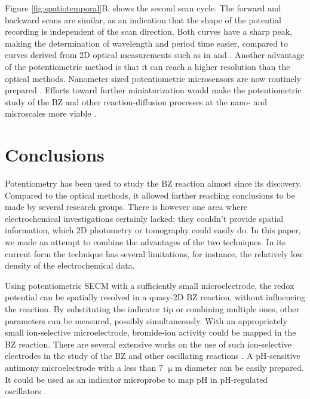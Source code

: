 \documentclass[3p, twocolumn]{elsarticle}
\begin{document}
Figure \ref{fig:spatiotemporal}B. shows the second scan cycle.
The forward and backward scans are similar, as an indication that the shape of the potential recording is independent of the scan direction.
Both curves have a sharp peak, making the determination of wavelength and period time easier, compared to curves derived from 2D optical measurements such as in \cite{hess1985} and \cite{hess1990}.
Another advantage of the potentiometric method is that it can reach a higher resolution than the optical methods.
Nanometer sized potentiometric microsensors are now routinely prepared \cite{mirkin2010}.
Efforts toward further miniaturization would make the potentiometric study of the BZ and other reaction-diffusion processes at the nano- and microscales more viable \cite{epstein2016}.

\section{Conclusions}
Potentiometry has been used to study the BZ reaction almost since its discovery.
Compared to the optical methods, it allowed farther reaching conclusions to be made by several research groups.
There is however one area where electrochemical investigations certainly lacked; they couldn't provide spatial information, which 2D photometry or tomography could easily do.
In this paper, we made an attempt to combine the advantages of the two techniques.
In its current form the technique has several limitations, for instance, the relatively low density of the electrochemical data.

Using potentiometric SECM with a sufficiently small microelectrode, the redox potential can be spatially resolved in a quasy-2D BZ reaction, without influencing the reaction.
By substituting the indicator tip or combining multiple ones, other parameters can be measured, possibly simultaneously.
With an appropriately small ion-selective microelectrode, bromide-ion activity could be mapped in the BZ reaction.
There are several extensive works on the use of such ion-selective electrodes in the study of the BZ and other oscillating reactions \cite{noszticzius1, noszticzius2}.
A pH-sensitive antimony microelectrode with a less than 7 $\upmu$m diameter can be easily prepared.
It could be used as an indicator microprobe to map pH in pH-regulated oscillators \cite{orban}.
\end{document}
